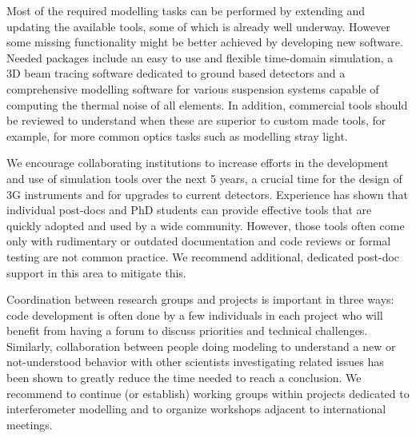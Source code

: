 Most of the required modelling tasks can be performed by extending and updating the available tools, some of which is already well underway. However some missing functionality might be better achieved by developing new software. Needed packages include an easy to use and flexible time-domain simulation, a \acs{3D} beam tracing software dedicated to ground based detectors and a comprehensive modelling software for various suspension systems capable of computing the thermal noise of all elements. In addition, commercial tools should be reviewed to understand when these are superior to custom made tools, for example, for more common optics tasks such as modelling stray light.

We encourage collaborating institutions to increase efforts in the development and use of simulation tools over the next 5 years, a crucial time for the design of \ac{3G}  instruments and for upgrades to current detectors.
Experience has shown that individual post-docs and PhD students can provide effective tools that are quickly adopted and used by a wide community. However, those tools often come only with rudimentary or outdated documentation and code reviews or formal testing 
are not common practice. We recommend additional, dedicated post-doc support in this area to mitigate this.

Coordination between research groups and projects is important in three ways:
code development is often done by a few individuals in each project who will benefit from having a forum to discuss priorities and technical challenges. 
Similarly, collaboration between people doing modeling to understand a new or not-understood behavior with other scientists investigating related issues has been shown to greatly reduce the time needed to reach a conclusion. 
We recommend to continue (or establish) working groups within projects dedicated to interferometer modelling and to organize workshops adjacent to international meetings.




